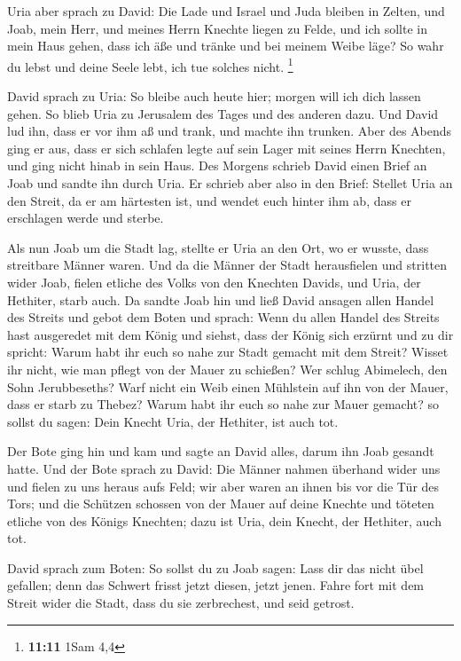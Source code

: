  Uria aber sprach zu David: Die Lade und Israel und Juda
bleiben in Zelten, und Joab, mein Herr, und meines Herrn Knechte liegen
zu Felde, und ich sollte in mein Haus gehen, dass ich äße und tränke und
bei meinem Weibe läge? So wahr du lebst und deine Seele lebt, ich tue
solches nicht. \footnote{\textbf{11:11} 1Sam 4,4}

 David sprach zu Uria: So bleibe auch heute hier; morgen
will ich dich lassen gehen. So blieb Uria zu Jerusalem des Tages und des
anderen dazu.  Und David lud ihn, dass er vor ihm aß und
trank, und machte ihn trunken. Aber des Abends ging er aus, dass er sich
schlafen legte auf sein Lager mit seines Herrn Knechten, und ging nicht
hinab in sein Haus.  Des Morgens schrieb David einen Brief
an Joab und sandte ihn durch Uria.  Er schrieb aber also in
den Brief: Stellet Uria an den Streit, da er am härtesten ist, und
wendet euch hinter ihm ab, dass er erschlagen werde und sterbe.

 Als nun Joab um die Stadt lag, stellte er Uria an den Ort,
wo er wusste, dass streitbare Männer waren.  Und da die
Männer der Stadt herausfielen und stritten wider Joab, fielen etliche
des Volks von den Knechten Davids, und Uria, der Hethiter, starb auch.
 Da sandte Joab hin und ließ David ansagen allen Handel des
Streits  und gebot dem Boten und sprach: Wenn du allen
Handel des Streits hast ausgeredet mit dem König  und
siehst, dass der König sich erzürnt und zu dir spricht: Warum habt ihr
euch so nahe zur Stadt gemacht mit dem Streit? Wisset ihr nicht, wie man
pflegt von der Mauer zu schießen?  Wer schlug Abimelech,
den Sohn Jerubbeseths? Warf nicht ein Weib einen Mühlstein auf ihn von
der Mauer, dass er starb zu Thebez? Warum habt ihr euch so nahe zur
Mauer gemacht? so sollst du sagen: Dein Knecht Uria, der Hethiter, ist
auch tot.

 Der Bote ging hin und kam und sagte an David alles, darum
ihn Joab gesandt hatte.  Und der Bote sprach zu David: Die
Männer nahmen überhand wider uns und fielen zu uns heraus aufs Feld; wir
aber waren an ihnen bis vor die Tür des Tors;  und die
Schützen schossen von der Mauer auf deine Knechte und töteten etliche
von des Königs Knechten; dazu ist Uria, dein Knecht, der Hethiter, auch
tot.

 David sprach zum Boten: So sollst du zu Joab sagen: Lass
dir das nicht übel gefallen; denn das Schwert frisst jetzt diesen, jetzt
jenen. Fahre fort mit dem Streit wider die Stadt, dass du sie
zerbrechest, und seid getrost.


